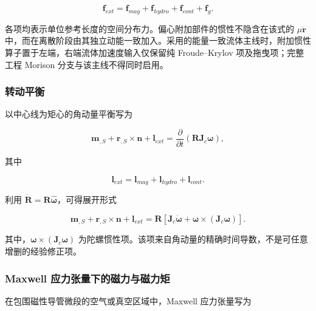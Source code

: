 \begin{equation}
\label{eq:rod-1-39}
\mathbf{f}_{ext} = \mathbf{f}_{mag} + \mathbf{f}_{hydro} + \mathbf{f}_{cont} + \mathbf{f}_{g}.
\end{equation}

各项均表示单位参考长度的空间分布力。偏心附加部件的惯性不隐含在该式的 \(\mu\ddot{\mathbf{r}}\) 中，而在离散阶段由其独立动能一致加入。采用的能量一致流体主线时，附加惯性算子置于左端，右端流体加速度输入仅保留纯 Froude--Krylov 项及拖曳项；完整工程 Morison 分支与该主线不得同时启用。

\subsubsection{转动平衡}\label{sec:rod-1-4-2}

以中心线为矩心的角动量平衡写为

\begin{equation}
\label{eq:rod-1-40}
\mathbf{m}_{,S} + \mathbf{r}_{,S} \times \mathbf{n} + \mathbf{l}_{ext} = \frac{\partial}{\partial t}\left( \mathbf{R}\mathbf{J}_{c}\bm{\omega} \right),
\end{equation}

其中

\begin{equation}
\label{eq:rod-1-41}
\mathbf{l}_{ext} = \mathbf{l}_{mag} + \mathbf{l}_{hydro} + \mathbf{l}_{cont}.
\end{equation}

利用 \(\dot{\mathbf{R}} = \mathbf{R}\widehat{\bm{\omega}}\)，可得展开形式

\begin{equation}
\label{eq:rod-1-42}
\mathbf{m}_{,S} + \mathbf{r}_{,S} \times \mathbf{n} + \mathbf{l}_{ext} = \mathbf{R}\left\lbrack \mathbf{J}_{c}\dot{\bm{\omega}} + \bm{\omega} \times \left( \mathbf{J}_{c}\bm{\omega} \right) \right\rbrack.
\end{equation}

其中，\(\bm{\omega} \times \left( \mathbf{J}_{c}\bm{\omega} \right)\) 为陀螺惯性项。该项来自角动量的精确时间导数，不是可任意增删的经验修正项。

\subsubsection{Maxwell 应力张量下的磁力与磁力矩}\label{sec:rod-1-4-3}

在包围磁性导管微段的空气或真空区域中，Maxwell 应力张量写为\cite{Jackson1998Electrodynamics,Abbott2020MagneticRobotics}


